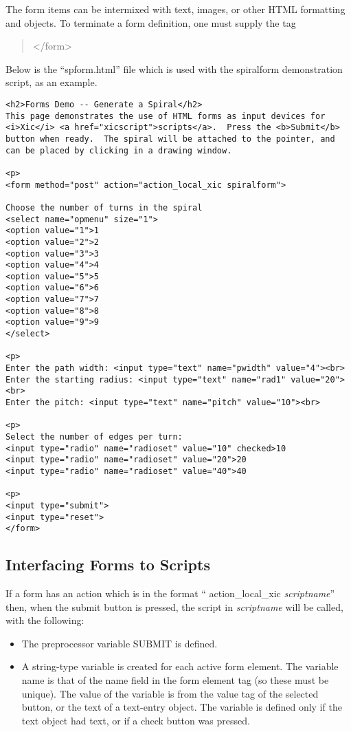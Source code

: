 The form items can be intermixed with text, images, or other HTML
formatting and objects.  To terminate a form definition, one must
supply the tag
\begin{quote}
{\vt </form>}
\end{quote}

Below is the ``{\vt spform.html}'' file which is used with the {\cb
spiralform} demonstration script, as an example.

\begin{verbatim}
<h2>Forms Demo -- Generate a Spiral</h2>
This page demonstrates the use of HTML forms as input devices for
<i>Xic</i> <a href="xicscript">scripts</a>.  Press the <b>Submit</b>
button when ready.  The spiral will be attached to the pointer, and
can be placed by clicking in a drawing window.

<p>
<form method="post" action="action_local_xic spiralform">

Choose the number of turns in the spiral
<select name="opmenu" size="1">
<option value="1">1
<option value="2">2
<option value="3">3
<option value="4">4
<option value="5">5
<option value="6">6
<option value="7">7
<option value="8">8
<option value="9">9
</select>

<p>
Enter the path width: <input type="text" name="pwidth" value="4"><br>
Enter the starting radius: <input type="text" name="rad1" value="20"><br>
Enter the pitch: <input type="text" name="pitch" value="10"><br>

<p>
Select the number of edges per turn:
<input type="radio" name="radioset" value="10" checked>10
<input type="radio" name="radioset" value="20">20
<input type="radio" name="radioset" value="40">40

<p>
<input type="submit">
<input type="reset">
</form>
\end{verbatim}

\subsection{Interfacing Forms to {\Xic} Scripts}

If a form has an action which is in the format ``{\vt
action\_local\_xic} {\it scriptname}'' then, when the {\cb submit}
button is pressed, the script in {\it scriptname} will be called, with
the following:

\begin{itemize}
\item The preprocessor variable SUBMIT is defined.
\item A string-type variable is created for each active form
element.  The variable name is that of the {\vt name} field in
the form element tag (so these must be unique).  The value of the
variable is from the {\vt value} tag of the selected button, or
the text of a text-entry object.  The variable is defined only if
the text object had text, or if a check button was pressed.
\end{itemize}

